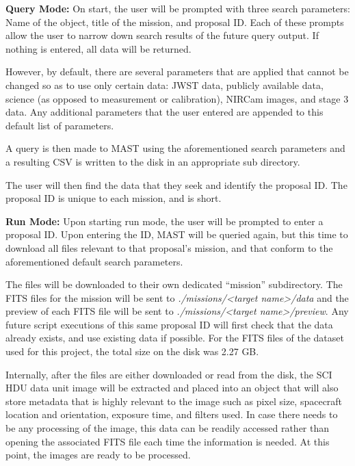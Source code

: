\documentclass[10pt,twocolumn,letterpaper]{article}
\begin{document}
\textbf{Query Mode:} On start, the user will be prompted with three search parameters: Name of the object, title of the mission, and proposal ID. Each of these prompts allow the user to narrow down search results of the future query output. If nothing is entered, all data will be returned.

However, by default, there are several parameters that are applied that cannot be changed so as to use only certain data: JWST data, publicly available data, science (as opposed to measurement or calibration), NIRCam images, and stage 3 data. Any additional parameters that the user entered are appended to this default list of parameters.

A query is then made to MAST using the aforementioned search parameters and a resulting CSV is written to the disk in an appropriate sub directory.

The user will then find the data that they seek and identify the proposal ID. The proposal ID is unique to each mission, and is short.

\textbf{Run Mode:} Upon starting run mode, the user will be prompted to enter a proposal ID. Upon entering the ID, MAST will be queried again, but this time to download all files relevant to that proposal's mission, and that conform to the aforementioned default search parameters.

The files will be downloaded to their own dedicated ``mission'' subdirectory. The FITS files for the mission will be sent to \emph{./missions/<target name>/data} and the preview of each FITS file will be sent to \emph{./missions/<target name>/preview}. Any future script executions of this same proposal ID will first check that the data already exists, and use existing data if possible. For the FITS files of the dataset used for this project, the total size on the disk was 2.27 GB.

Internally, after the files are either downloaded or read from the disk, the SCI HDU data unit image will be extracted and placed into an object that will also store metadata that is highly relevant to the image such as pixel size, spacecraft location and orientation, exposure time, and filters used. In case there needs to be any processing of the image, this data can be readily accessed rather than opening the associated FITS file each time the information is needed. At this point, the images are ready to be processed.
\end{document}
